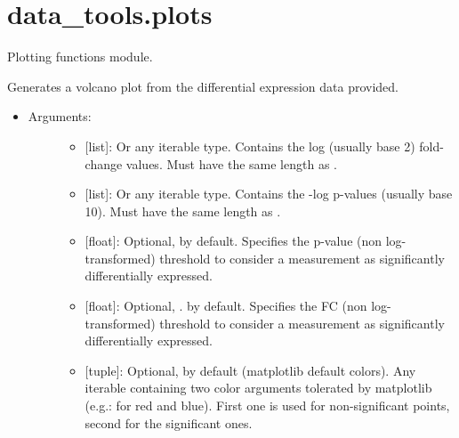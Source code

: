 \documentclass[letterpaper,10pt,english]{sphinxmanual}
\begin{document}
\label{\detokenize{plots:module-data_tools.plots}}

\section{data\_tools.plots}
\label{\detokenize{plots::doc}}\label{\detokenize{plots:data-tools-plots}}
Plotting functions module.

\begin{fulllineitems}
\label{\detokenize{plots:data_tools.plots.volcano}}
Generates a volcano plot from the differential expression data
provided.
\begin{itemize}
\item {} \begin{description}
\item[{Arguments:}] \leavevmode\begin{itemize}
\item {} 
 {[}list{]}: Or any iterable type. Contains the log
(usually base 2) fold-change values. Must have the same length
as .

\item {} 
 {[}list{]}: Or any iterable type. Contains the -log
p-values (usually base 10). Must have the same length as
.

\item {} 
 {[}float{]}: Optional,  by default. Specifies
the p-value (non log-transformed) threshold to consider a
measurement as significantly differentially expressed.

\item {} 
 {[}float{]}: Optional, . by default. Specifies the
FC (non log-transformed) threshold to consider a measurement
as significantly differentially expressed.

\item {} 
 {[}tuple{]}: Optional,  by default (matplotlib
default colors). Any iterable containing two color arguments
tolerated by matplotlib (e.g.: \sphinxcode{{[}'r', 'b'{]}} for red and
blue). First one is used for non-significant points, second
for the significant ones.


\end{itemize}
\end{description}
\end{itemize}
\end{fulllineitems}
\end{document}
